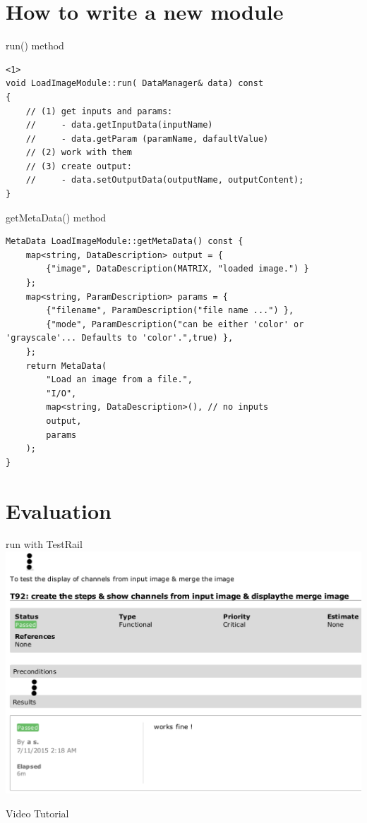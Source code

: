\documentclass{beamer}
\newcommand{\beginbackup}{
   \newcounter{framenumbervorappendix}
   \setcounter{framenumbervorappendix}{\value{framenumber}}
}
\newcommand{\backupend}{
   \addtocounter{framenumbervorappendix}{-\value{framenumber}}
   \addtocounter{framenumber}{\value{framenumbervorappendix}}
}
\begin{document}
\section{How to write a new module}
\begin{frame}[fragile]{run() method}

	\begin{lstlisting}<1>
void LoadImageModule::run( DataManager& data) const
{
	// (1) get inputs and params:
	//     - data.getInputData(inputName)
	//     - data.getParam (paramName, dafaultValue)
	// (2) work with them
	// (3) create output:
	//     - data.setOutputData(outputName, outputContent);
}
	\end{lstlisting}

\end{frame}


\begin{frame}[fragile]{getMetaData() method}

	\begin{lstlisting}
MetaData LoadImageModule::getMetaData() const {
	map<string, DataDescription> output = {
		{"image", DataDescription(MATRIX, "loaded image.") }
	};
	map<string, ParamDescription> params = {
		{"filename", ParamDescription("file name ...") },
		{"mode", ParamDescription("can be either 'color' or 'grayscale'... Defaults to 'color'.",true) },
	};
	return MetaData(
		"Load an image from a file.",
		"I/O",
		map<string, DataDescription>(), // no inputs
		output,
		params
	);
}
	\end{lstlisting}
\end{frame}


\section{Evaluation}
\begin{frame}{run with TestRail}
	\includegraphics[width=\textwidth]{images/eval}
\end{frame}

\begin{frame}{Video Tutorial}
\end{frame}





\end{document}
